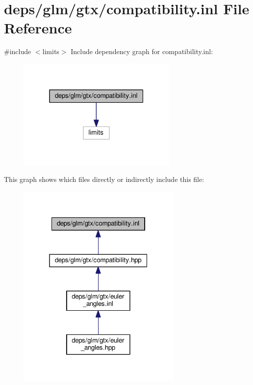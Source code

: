 \hypertarget{compatibility_8inl}{}\section{deps/glm/gtx/compatibility.inl File Reference}
\label{compatibility_8inl}
{\ttfamily \#include $<$limits$>$}\newline
Include dependency graph for compatibility.\+inl\+:
\nopagebreak
\begin{figure}[H]
\begin{center}
\leavevmode
\includegraphics[width=223pt]{d4/dca/compatibility_8inl__incl}
\end{center}
\end{figure}
This graph shows which files directly or indirectly include this file\+:
\nopagebreak
\begin{figure}[H]
\begin{center}
\leavevmode
\includegraphics[width=229pt]{df/d53/compatibility_8inl__dep__incl}
\end{center}
\end{figure}
